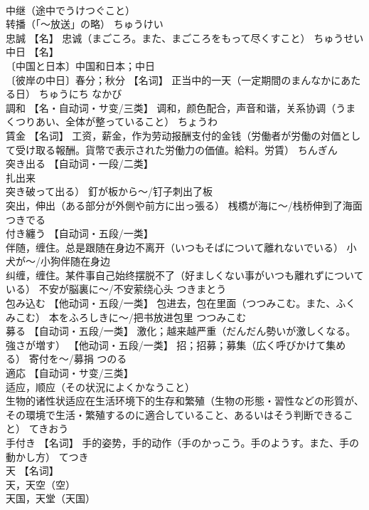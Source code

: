 \documentclass[8pt]{extreport}
\begin{document}
\begin{CJK}{UTF8}{min}
\\	中继（途中でうけつぐこと） 
\\	转播（「～放送」の略）	ちゅうけい	
\\	忠誠	【名】 忠诚（まごころ。また、まごころをもって尽くすこと）	ちゅうせい	
\\	中日	【名】 
\\	〔中国と日本〕中国和日本；中日 
\\	〔彼岸の中日〕春分；秋分 【名词】 正当中的一天（一定期間のまんなかにあたる日）	ちゅうにち なかび	
\\	調和	【名・自动词・サ变/三类】 调和，颜色配合，声音和谐，关系协调（うまくつりあい、全体が整っていること）	ちょうわ	
\\	賃金	【名词】 工资，薪金，作为劳动报酬支付的金钱（労働者が労働の対価として受け取る報酬。貨幣で表示された労働力の価値。給料。労賃）	ちんぎん	
\\	突き出る	【自动词・一段/二类】 
\\	扎出来
\\	突き破って出る） 釘が板から～/钉子刺出了板 
\\	突出，伸出（ある部分が外側や前方に出っ張る） 桟橋が海に～/栈桥伸到了海面	つきでる	
\\	付き纏う	【自动词・五段/一类】 
\\	伴随，缠住。总是跟随在身边不离开（いつもそばについて離れないでいる） 小犬が～/小狗伴随在身边 
\\	纠缠，缠住。某件事自己始终摆脱不了（好ましくない事がいつも離れずについている） 不安が脳裏に～/不安萦绕心头	つきまとう	
\\	包み込む	【他动词・五段/一类】 包进去，包在里面（つつみこむ。また、ふくみこむ） 本をふろしきに～/把书放进包里	つつみこむ	
\\	募る	【自动词・五段/一类】 激化；越来越严重（だんだん勢いが激しくなる。強さが増す） 【他动词・五段/一类】 招；招募；募集（広く呼びかけて集める） 寄付を～/募捐	つのる	
\\	適応	【自动词・サ变/三类】 
\\	适应，顺应（その状況によくかなうこと） 
\\	生物的诸性状适应在生活环境下的生存和繁殖（生物の形態・習性などの形質が、その環境で生活・繁殖するのに適合していること、あるいはそう判断できること）	てきおう	
\\	手付き	【名词】 手的姿势，手的动作（手のかっこう。手のようす。また、手の動かし方）	てつき	
\\	天	【名词】 
\\	天，天空（空） 
\\	天国，天堂（天国） 

\end{CJK}
\end{document}
